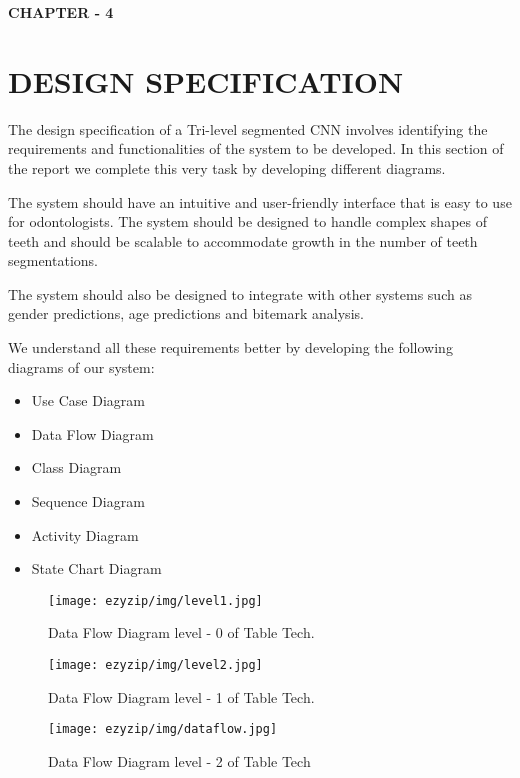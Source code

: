 \clearpage
\begin{center}
    \bf {\LARGE CHAPTER - 4}
\end{center}
\section{DESIGN SPECIFICATION}

The design specification of a Tri-level segmented CNN involves identifying the requirements and functionalities of the system to be developed. In this section of the report we complete this very task by developing different diagrams.

The system should have an intuitive and user-friendly interface that is easy to use for odontologists. The system should be designed to handle complex shapes of teeth and should be scalable to accommodate growth in the number of teeth segmentations.

The system should also be designed to integrate with other systems such as gender predictions, age predictions and bitemark analysis.

We understand all these requirements better by developing the following diagrams of our system:
\begin{itemize}
    \item Use Case Diagram
    \item Data Flow Diagram
    \item Class Diagram
    \item Sequence Diagram
    \item Activity Diagram
    \item State Chart Diagram
    

\end{itemize}


\begin{figure}[H]
	\centering
	 \texttt{[image: ezyzip/img/level1.jpg]}
	\caption{\small Data Flow Diagram level - 0 of Table Tech.}
	\label{fig:polarization}
\end{figure}

\begin{figure}[H]
	\centering
	 \texttt{[image: ezyzip/img/level2.jpg]}
	\caption{\small Data Flow Diagram level - 1 of Table Tech.}
	\label{fig:polarization}
\end{figure}	


\begin{figure}[H]
	\centering
	 \texttt{[image: ezyzip/img/dataflow.jpg]}
	\caption{\small  Data Flow Diagram level - 2 of Table Tech}
	\label{fig:polarization}
\end{figure}	

